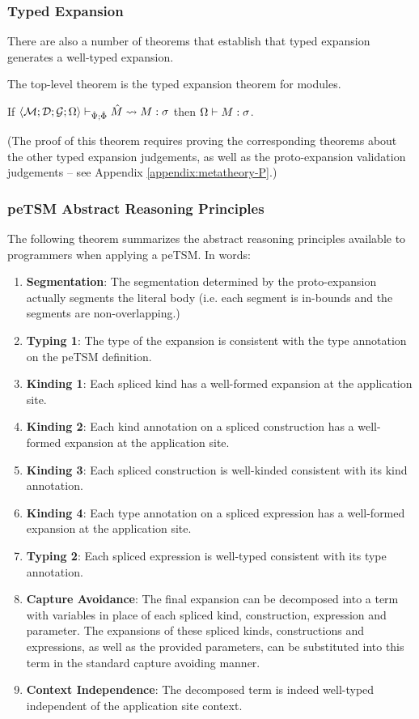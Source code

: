 \subsubsection{Typed Expansion}
There are also a number of theorems that establish that typed expansion generates a well-typed expansion.

The top-level theorem is the typed expansion theorem for modules. 

\begingroup
\def\thetheorem{\ref{thm:module-expansion-P}}
\begin{theorem}
If $\langle \mathcal{M}; \mathcal{D}; \mathcal{G}; \Omega \rangle \vdash_{\hat{\Psi}; \hat\Phi} {\hat M} \leadsto M : \sigma$ then $\Omega \vdash M : \sigma$.
\end{theorem}
\endgroup

(The proof of this theorem requires proving the corresponding theorems about the other typed expansion judgements, as well as the proto-expansion validation judgements -- see Appendix \ref{appendix:metatheory-P}.)

\subsubsection{peTSM Abstract Reasoning Principles}
The following theorem summarizes the abstract reasoning principles available to programmers when applying a peTSM. In words:
\begin{enumerate}
	\item \textbf{Segmentation}: The segmentation determined by the proto-expansion actually segments the literal body (i.e. each segment is in-bounds and the segments are non-overlapping.)
	\item \textbf{Typing 1}: The type of the expansion is consistent with the type annotation on the peTSM definition.
	\item \textbf{Kinding 1}: Each spliced kind has a well-formed expansion at the application site.
	\item \textbf{Kinding 2}: Each kind annotation on a spliced construction has a well-formed expansion at the application site.
	\item \textbf{Kinding 3}: Each spliced construction is well-kinded consistent with its kind annotation.
	\item \textbf{Kinding 4}: Each type annotation on a spliced expression has a well-formed expansion at the application site.
	\item \textbf{Typing 2}: Each spliced expression is well-typed consistent with its type annotation.
	\item \textbf{Capture Avoidance}: The final expansion can be decomposed into a term with variables in place of each spliced kind, construction, expression and parameter. The expansions of these spliced kinds, constructions and expressions, as well as the provided parameters, can be substituted into this term in the standard capture avoiding manner.
	\item \textbf{Context Independence}: The decomposed term is indeed well-typed independent of the application site context.
\end{enumerate}

